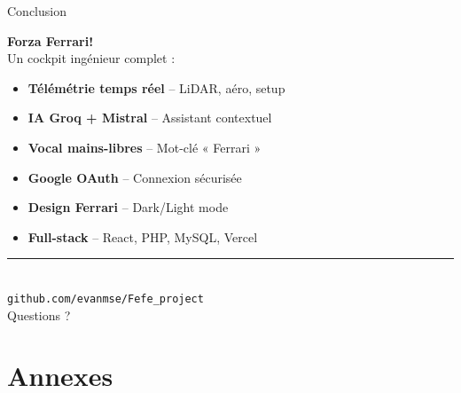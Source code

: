 \documentclass[11pt,aspectratio=169]{beamer}
\begin{document}
\begin{frame}{Conclusion}
  \begin{center}
    {\Huge \textcolor{ferrariRed}{\textbf{Forza Ferrari!}}} \\[0.8cm]

    {\Large Un cockpit ing\'enieur complet :} \\[0.5cm]

    \begin{itemize}
      \setlength\itemsep{0.3cm}
      \item \textbf{T\'el\'em\'etrie temps r\'eel} -- LiDAR, a\'ero, setup
      \item \textbf{IA Groq + Mistral} -- Assistant contextuel
      \item \textbf{Vocal mains-libres} -- Mot-cl\'e « Ferrari »
      \item \textbf{Google OAuth} -- Connexion s\'ecuris\'ee
      \item \textbf{Design Ferrari} -- Dark/Light mode
      \item \textbf{Full-stack} -- React, PHP, MySQL, Vercel
    \end{itemize}

    \vspace{0.6cm}
    \rule{6cm}{2pt} \\[0.3cm]
    {\large \texttt{github.com/evanmse/Fefe\_project}} \\[0.2cm]
    \textcolor{ferrariMuted}{Questions ?}
  \end{center}
\end{frame}

\appendix
\section{Annexes}
\end{document}
